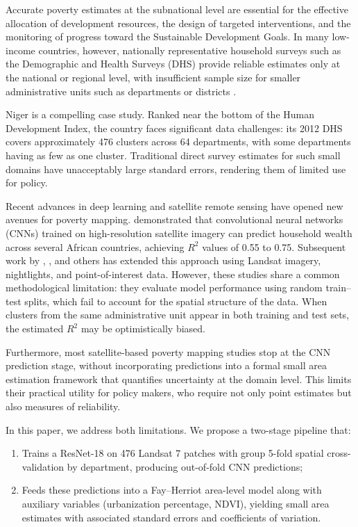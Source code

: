 \documentclass[11pt,a4paper]{article}
\newcommand{\Rtwo}{\ensuremath{R^2}}
\begin{document}
Accurate poverty estimates at the subnational level are essential for the effective allocation of development resources, the design of targeted interventions, and the monitoring of progress toward the Sustainable Development Goals. In many low-income countries, however, nationally representative household surveys such as the Demographic and Health Surveys (DHS) provide reliable estimates only at the national or regional level, with insufficient sample size for smaller administrative units such as departments or districts \citep{elbers2003}.

Niger is a compelling case study. Ranked near the bottom of the Human Development Index, the country faces significant data challenges: its 2012 DHS covers approximately 476 clusters across 64 departments, with some departments having as few as one cluster. Traditional direct survey estimates for such small domains have unacceptably large standard errors, rendering them of limited use for policy.

Recent advances in deep learning and satellite remote sensing have opened new avenues for poverty mapping. \citet{jean2016} demonstrated that convolutional neural networks (CNNs) trained on high-resolution satellite imagery can predict household wealth across several African countries, achieving \Rtwo{} values of 0.55 to 0.75. Subsequent work by \citet{yeh2020}, \citet{deepwealth2024}, and others has extended this approach using Landsat imagery, nightlights, and point-of-interest data. However, these studies share a common methodological limitation: they evaluate model performance using random train--test splits, which fail to account for the spatial structure of the data. When clusters from the same administrative unit appear in both training and test sets, the estimated \Rtwo{} may be optimistically biased.

Furthermore, most satellite-based poverty mapping studies stop at the CNN prediction stage, without incorporating predictions into a formal small area estimation framework that quantifies uncertainty at the domain level. This limits their practical utility for policy makers, who require not only point estimates but also measures of reliability.

In this paper, we address both limitations. We propose a two-stage pipeline that:
\begin{enumerate}
    \item Trains a ResNet-18 on 476 Landsat 7 patches with group 5-fold spatial cross-validation by department, producing out-of-fold CNN predictions;
    \item Feeds these predictions into a Fay--Herriot area-level model \citep{fay1979} along with auxiliary variables (urbanization percentage, NDVI), yielding small area estimates with associated standard errors and coefficients of variation.
\end{enumerate}
\end{document}
